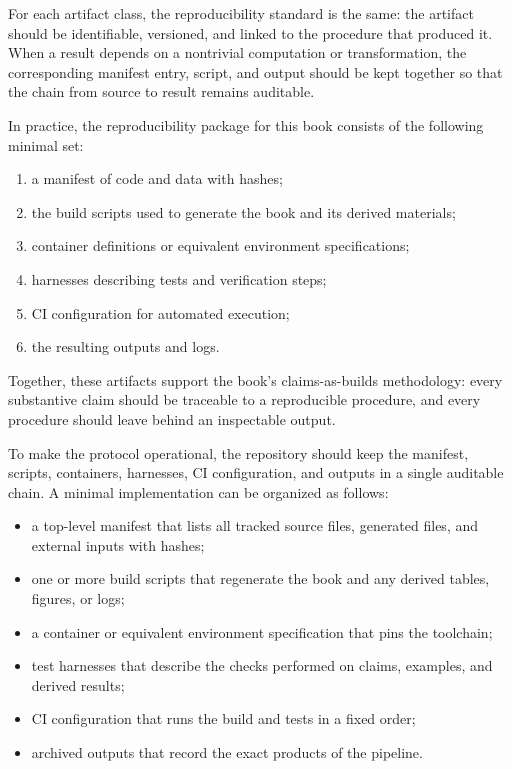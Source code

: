 For each artifact class, the reproducibility standard is the same: the artifact should be identifiable, versioned, and linked to the procedure that produced it. When a result depends on a nontrivial computation or transformation, the corresponding manifest entry, script, and output should be kept together so that the chain from source to result remains auditable.

In practice, the reproducibility package for this book consists of the following minimal set:
\begin{enumerate}
  \item a manifest of code and data with hashes;
  \item the build scripts used to generate the book and its derived materials;
  \item container definitions or equivalent environment specifications;
  \item harnesses describing tests and verification steps;
  \item CI configuration for automated execution;
  \item the resulting outputs and logs.
\end{enumerate}

Together, these artifacts support the book's claims-as-builds methodology: every substantive claim should be traceable to a reproducible procedure, and every procedure should leave behind an inspectable output.

To make the protocol operational, the repository should keep the manifest, scripts, containers, harnesses, CI configuration, and outputs in a single auditable chain. A minimal implementation can be organized as follows:
\begin{itemize}
  \item a top-level manifest that lists all tracked source files, generated files, and external inputs with hashes;
  \item one or more build scripts that regenerate the book and any derived tables, figures, or logs;
  \item a container or equivalent environment specification that pins the toolchain;
  \item test harnesses that describe the checks performed on claims, examples, and derived results;
  \item CI configuration that runs the build and tests in a fixed order;
  \item archived outputs that record the exact products of the pipeline.
\end{itemize}


